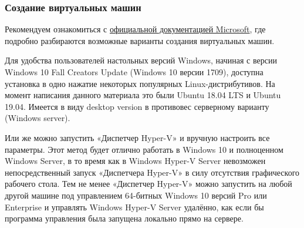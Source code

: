 \documentclass[14pt, a4paper]{article}
\begin{document}
\subsubsection*{Создание виртуальных машин}

Рекомендуем ознакомиться с \href{https://docs.microsoft.com/en-us/windows-server/virtualization/hyper-v/get-started/create-a-virtual-machine-in-hyper-v}{официальной документацией Microsoft}, где подробно разбираются
возможные варианты создания виртуальных машин.

Для удобства пользователей настольных версий Windows, начиная с версии Windows 10 Fall Creators
Update (Windows 10 версии 1709), доступна установка в одно нажатие некоторых популярных
Linux-дистрибутивов. На момент написания данного материала это были Ubuntu 18.04 LTS и Ubuntu
19.04. Имеется в виду desktop version в противовес серверному варианту (Windows server).

\begin{figure}[h]%
    \centering
    \label{1.4 1.5} %
\end{figure}

Или же можно запустить «Диспетчер Hyper-V» и вручную настроить все параметры. Этот метод будет
отлично работать в Windows 10 и полноценном Windows Server, в то время как в Windows Hyper-V
Server невозможен непосредственный запуск «Диспетчера Hyper-V» в силу отсутствия графического
рабочего стола. Тем не менее «Диспетчер Hyper-V» можно запустить на любой другой машине под
управлением 64-битных Windows 10 версий Pro или Enterprise и управлять Windows Hyper-V Server
удалённо, как если бы программа управления была запущена локально прямо на сервере.
\end{document}
